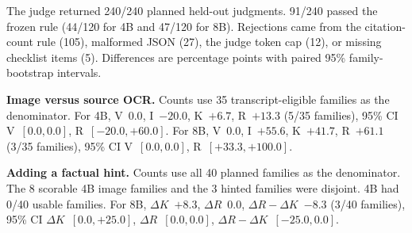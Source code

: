 The judge returned 240/240 planned held-out judgments. 91/240 passed the frozen rule (44/120 for 4B and 47/120 for 8B). Rejections came from the citation-count rule (105), malformed JSON (27), the judge token cap (12), or missing checklist items (5). Differences are percentage points with paired 95\% family-bootstrap intervals.

\textbf{Image versus source OCR.} Counts use 35 transcript-eligible families as the denominator. For 4B, V~$0.0$, I~$-20.0$, K~$+6.7$, R~$+13.3$ (5/35 families), 95\% CI V~$[0.0, 0.0]$, R~$[-20.0, +60.0]$. For 8B, V~$0.0$, I~$+55.6$, K~$+41.7$, R~$+61.1$ (3/35 families), 95\% CI V~$[0.0, 0.0]$, R~$[+33.3, +100.0]$.

\textbf{Adding a factual hint.} Counts use all 40 planned families as the denominator. The 8 scorable 4B image families and the 3 hinted families were disjoint. 4B had 0/40 usable families. For 8B, $\Delta K$~$+8.3$, $\Delta R$~$0.0$, $\Delta R-\Delta K$~$-8.3$ (3/40 families), 95\% CI $\Delta K$~$[0.0, +25.0]$, $\Delta R$~$[0.0, 0.0]$, $\Delta R-\Delta K$~$[-25.0, 0.0]$.
